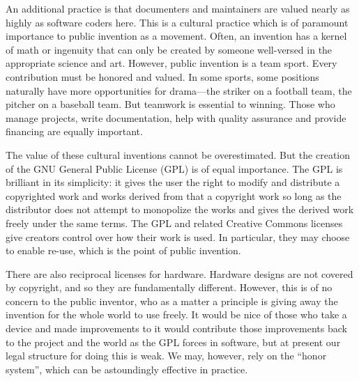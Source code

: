 \documentclass[
	fontsize=10pt, %
	twoside=false, %
	secnumdepth=1, %
]{kaobook}
\begin{document}
An additional practice is that documenters and maintainers
are valued nearly as highly as software coders here.
This is a cultural practice which is of paramount importance
to public invention as a movement.
Often, an invention has a kernel of math or ingenuity
that can only be created by someone well-versed in the
appropriate science and art.
However, public invention is a team sport.
Every contribution must be honored and valued.
In some sports, some positions naturally have more
opportunities for drama---the striker on a football team,
the pitcher on a baseball team.
But teamwork is essential to winning.
Those who manage projects, write documentation,
help with quality assurance and provide financing are
equally important.

The value of these cultural inventions cannot be overestimated.
But the creation of the GNU General Public License (GPL)
is of equal importance.
The GPL is brilliant in its simplicity: it gives the
user the right to modify and distribute a copyrighted work
and works derived from that a copyright work so long as
the distributor does not attempt to monopolize the works
and gives the derived work freely under the same terms.
The GPL and related Creative Commons licenses give
creators control over how their work is used.
In particular, they may choose to enable re-use, which
is the point of public invention.

There are also reciprocal licenses for hardware.
Hardware designs are not covered by copyright, and
so they are fundamentally different.
However, this is of no concern to the public inventor,
who as a matter a principle is giving away the invention
for the whole world to use freely.
It would be nice of those who take a device and made
improvements to it would contribute those improvements
back to the project and the world as the GPL forces
in software, but at present our legal structure for
doing this is weak.
We may, however, rely on the ``honor system'', which
can be astoundingly effective in practice.
\end{document}
